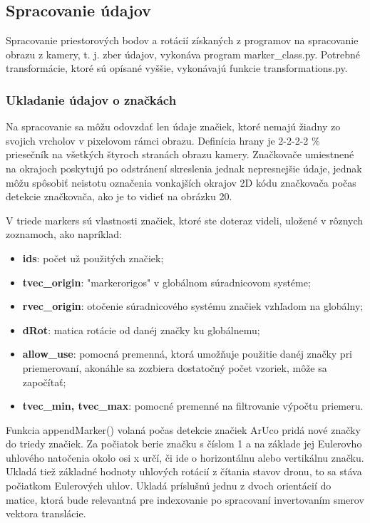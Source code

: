 \subsection{Spracovanie údajov}
Spracovanie priestorových bodov a rotácií získaných z programov na spracovanie obrazu z kamery, t. j. zber údajov, vykonáva program marker\_class.py. Potrebné transformácie, ktoré sú opísané vyššie, vykonávajú funkcie transformations.py.
\subsubsection{Ukladanie údajov o značkách}
Na spracovanie sa môžu odovzdať len údaje značiek, ktoré nemajú žiadny zo svojich vrcholov v pixelovom rámci obrazu. Definícia hrany je 2-2-2-2 \% priesečník na všetkých štyroch stranách obrazu kamery. Značkovače umiestnené na okrajoch poskytujú po odstránení skreslenia jednak nepresnejšie údaje, jednak môžu spôsobiť neistotu označenia vonkajších okrajov 2D kódu značkovača počas detekcie značkovača, ako je to vidieť na obrázku 20.

V triede markers sú vlastnosti značiek, ktoré ste doteraz videli, uložené v rôznych zoznamoch, ako napríklad:
\begin{itemize}
    \item \textbf{ids}: počet už použitých značiek;
    \item \textbf{tvec\_origin}: "markerorigos" v globálnom súradnicovom systéme;
    \item \textbf{rvec\_origin}: otočenie súradnicového systému značiek vzhľadom na globálny;
    \item \textbf{dRot}: matica rotácie od danéj značky ku globálnemu;
    \item \textbf{allow\_use}: pomocná premenná, ktorá umožňuje použitie danéj značky pri priemerovaní, akonáhle sa zozbiera dostatočný počet vzoriek, môže sa započítať;
    \item \textbf{tvec\_min, tvec\_max}: pomocné premenné na filtrovanie výpočtu priemeru.
\end{itemize}

Funkcia appendMarker() volaná počas detekcie značiek ArUco pridá nové značky do triedy značiek. Za počiatok berie značku s číslom 1 a na základe jej Eulerovho uhlového natočenia okolo osi x určí, či ide o horizontálnu alebo vertikálnu značku. Ukladá tiež základné hodnoty uhlových rotácií z čítania stavov dronu, to sa stáva počiatkom Eulerových uhlov. Ukladá príslušnú jednu z dvoch orientácií do matice, ktorá bude relevantná pre indexovanie po spracovaní invertovaním smerov vektora translácie.

